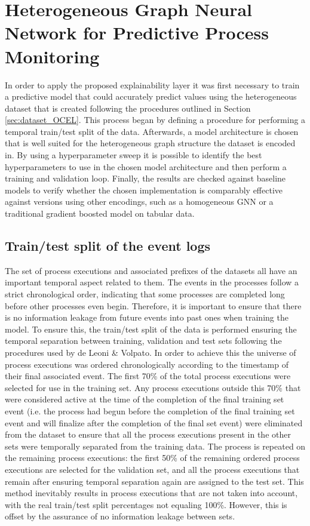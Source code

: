 \section{Heterogeneous Graph Neural Network for Predictive Process Monitoring}
    In order to apply the proposed explainability layer it was first necessary to train a predictive model that could accurately predict values using the heterogeneous dataset that is created following the procedures outlined in Section \ref{sec:dataset_OCEL}. This process began by defining a procedure for performing a temporal train/test split of the data. Afterwards, a model architecture is chosen that is well suited for the heterogeneous graph structure the dataset is encoded in. By using a hyperparameter sweep it is possible to identify the best hyperparameters to use in the chosen model architecture and then perform a training and validation loop. Finally, the results are checked against baseline models to verify whether the chosen implementation is comparably effective against versions using other encodings, such as a homogeneous GNN or a traditional gradient boosted model on tabular data.

    \subsection{Train/test split of the event logs}
        The set of process executions and associated prefixes of the datasets all have an important temporal aspect related to them. The events in the processes follow a strict chronological order, indicating that some processes are completed long before other processes even begin. Therefore, it is important to ensure that there is no information leakage from future events into past ones when training the model. To ensure this, the train/test split of the data is performed ensuring the temporal separation between training, validation and test sets following the procedures used by de Leoni \& Volpato\cite{deleonieVolpato}.
        In order to achieve this the universe of process executions was ordered chronologically according to the timestamp of their final associated event. The first 70\% of the total process executions were selected for use in the training set. Any process executions outside this 70\% that were considered active at the time of the completion of the final training set event (i.e. the process had begun before the completion of the final training set event and will finalize after the completion of the final set event) were eliminated from the dataset to ensure that all the process executions present in the other sets were temporally separated from the training data. The process is repeated on the remaining process executions: the first 50\% of the remaining ordered process executions are selected for the validation set, and all the process executions that remain after ensuring temporal separation again are assigned to the test set. This method inevitably results in process executions that are not taken into account, with the real train/test split percentages not equaling 100\%. However, this is offset by the assurance of no information leakage between sets.


